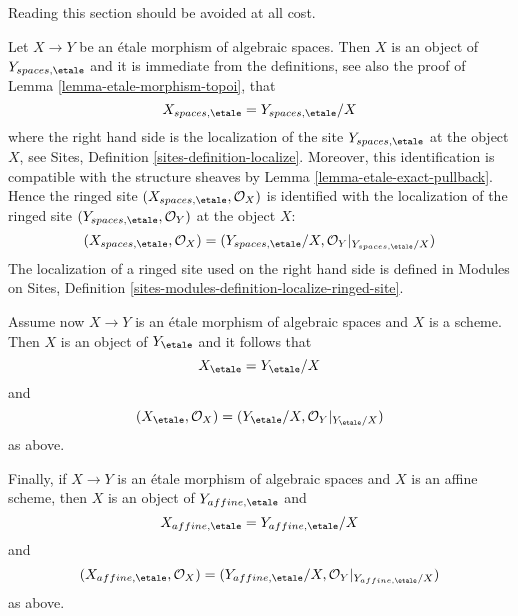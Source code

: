 \noindent
Reading this section should be avoided at all cost.

\medskip\noindent
Let $X \to Y$ be an \'etale morphism of algebraic spaces.
Then $X$ is an object of $Y_{spaces, \etale}$ and it is
immediate from the definitions, see also the proof of
Lemma \ref{lemma-etale-morphism-topoi},
that
\begin{equation}
\label{equation-localize}
X_{spaces, \etale} = Y_{spaces, \etale}/X
\end{equation}
where the right hand side is the localization of the site
$Y_{spaces, \etale}$ at the object $X$, see
Sites, Definition \ref{sites-definition-localize}.
Moreover, this identification is compatible with the structure sheaves by
Lemma \ref{lemma-etale-exact-pullback}.
Hence the ringed site $(X_{spaces, \etale}, \mathcal{O}_X)$
is identified with the localization of the ringed site
$(Y_{spaces, \etale}, \mathcal{O}_Y)$ at the object $X$:
\begin{equation}
\label{equation-localize-ringed}
(X_{spaces, \etale}, \mathcal{O}_X) =
(Y_{spaces, \etale}/X, \mathcal{O}_Y|_{Y_{spaces, \etale}/X})
\end{equation}
The localization of a ringed site used on the right hand side is defined in
Modules on Sites,
Definition \ref{sites-modules-definition-localize-ringed-site}.

\medskip\noindent
Assume now $X \to Y$ is an \'etale morphism of algebraic spaces and $X$ is
a scheme. Then $X$ is an object of $Y_\etale$ and it follows that
\begin{equation}
\label{equation-localize-at-scheme}
X_\etale = Y_\etale/X
\end{equation}
and
\begin{equation}
\label{equation-localize-at-scheme-ringed}
(X_\etale, \mathcal{O}_X) =
(Y_\etale/X, \mathcal{O}_Y|_{Y_\etale/X})
\end{equation}
as above.

\medskip\noindent
Finally, if $X \to Y$ is an \'etale morphism of algebraic spaces and $X$ is
an affine scheme, then $X$ is an object of $Y_{affine, \etale}$ and
\begin{equation}
\label{equation-localize-at-affine}
X_{affine, \etale} = Y_{affine, \etale}/X
\end{equation}
and
\begin{equation}
\label{equation-localize-at-affine-ringed}
(X_{affine, \etale}, \mathcal{O}_X) =
(Y_{affine, \etale}/X, \mathcal{O}_Y|_{Y_{affine, \etale}/X})
\end{equation}
as above.


